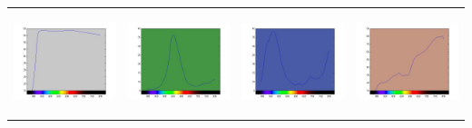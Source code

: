 \begin{tabular}{  c c c c }
\includegraphics[width=3.0cm,height=3.0cm]{ColorPaper/ch17.jpg}
&
\includegraphics[width=3.0cm,height=3.0cm]{ColorPaper/ch18.jpg}
&
\includegraphics[width=3.0cm,height=3.0cm]{ColorPaper/ch19.jpg}
&
\includegraphics[width=3.0cm,height=3.0cm]{ColorPaper/ch20.jpg}
\\


\end{tabular}

